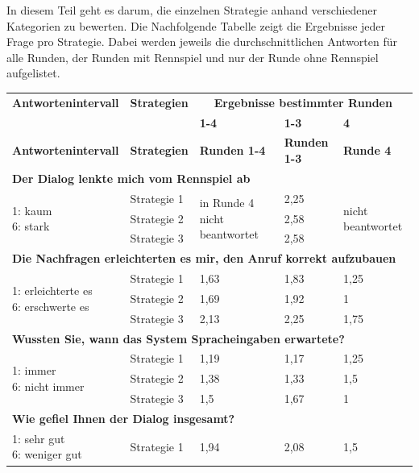 \documentclass[12pt,a4paper]{scrartcl}
\begin{document}
In diesem Teil geht es darum, die einzelnen Strategie anhand verschiedener Kategorien zu bewerten.
Die Nachfolgende Tabelle zeigt die Ergebnisse jeder Frage pro Strategie. Dabei werden jeweils die durchschnittlichen Antworten für alle Runden, der Runden mit Rennspiel und nur der Runde ohne Rennspiel aufgelistet. 
\newline

\begin{longtable}{|p{4cm}|p{2cm}|p{2cm}|p{2cm}|p{2cm}|}
	\hline
		\textbf{Antwortenintervall}&\textbf{Strategien}&\multicolumn{3}{c|}{\textbf{Ergebnisse bestimmter Runden}}\\
	&&\textbf{1-4}&\textbf{1-3} &\textbf{4}\\
	\hline
	\endfirsthead
	\hline
	\textbf{Antwortenintervall}&\textbf{Strategien}&\textbf{Runden 1-4}&\textbf{Runden 1-3} &\textbf{Runde 4}\\
	\hline
	\endhead
		\multicolumn{5}{l}{\textbf{Der Dialog lenkte mich vom Rennspiel ab}}\\
		\hline
\multirow{3}{4cm}{1: kaum \newline 6: stark} & Strategie 1 & \multirow{3}{2,5cm}{in Runde 4 nicht beantwortet} & 2,25  & \multirow{3}{2,5cm}{nicht beantwortet} \\
 & Strategie 2 & & 2,58 & \\
 & Strategie 3 & & 2,58 & \\
\hline
		\multicolumn{5}{l}{\textbf{Die Nachfragen erleichterten es mir, den Anruf korrekt aufzubauen}}\\
		\hline
\multirow{3}{4cm}{1: erleichterte es\newline  6: erschwerte es} & Strategie 1 & 1,63 & 1,83 & 1,25 \\
 & Strategie 2 & 1,69 & 1,92 & 1 \\
 & Strategie 3 & 2,13 & 2,25 & 1,75 \\
\hline
		\multicolumn{5}{l}{\textbf{Wussten Sie, wann das System Spracheingaben erwartete?}}\\
		\hline
\multirow{3}{4cm}{1: immer \newline  6: nicht immer} & Strategie 1 & 1,19 & 1,17 & 1,25 \\
 & Strategie 2 & 1,38 & 1,33 & 1,5 \\
 & Strategie 3 & 1,5 & 1,67 & 1 \\
\hline
		\multicolumn{5}{l}{\textbf{Wie gefiel Ihnen der Dialog insgesamt?}}\\
		\hline
\multirow{3}{4cm}{1: sehr gut \newline  6: weniger gut} & Strategie 1 & 1,94 & 2,08 & 1,5 \\

\end{longtable}
\end{document}

